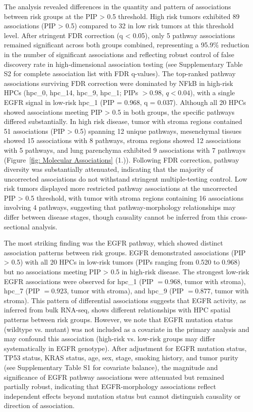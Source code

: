 \documentclass[pdflatex,article,12pt]{article}
\begin{document}
The analysis revealed differences in the quantity and pattern of associations between risk groups at the PIP > 0.5 threshold. High risk tumors exhibited 89 associations (PIP > 0.5) compared to 32 in low risk tumors at this threshold level. After stringent FDR correction (q < 0.05), only 5 pathway associations remained significant across both groups combined, representing a 95.9\% reduction in the number of significant associations and reflecting robust control of false discovery rate in high-dimensional association testing (see Supplementary Table S2 for complete association list with FDR q-values). The top-ranked pathway associations surviving FDR correction were dominated by NFkB in high-risk HPCs (hpc\_0, hpc\_14, hpc\_9, hpc\_1; PIPs $> 0.98$, $q < 0.04$), with a single EGFR signal in low-risk hpc\_1 (PIP = 0.968, q = 0.037). Although all 20 HPCs showed associations meeting PIP > 0.5 in both groups, the specific pathways differed substantially. In high risk disease, tumor with stroma regions contained 51 associations (PIP > 0.5) spanning 12 unique pathways, mesenchymal tissues showed 15 associations with 8 pathways, stroma regions showed 12 associations with 5 pathways, and lung parenchyma exhibited 9 associations with 7 pathways (Figure~\ref{fig: Molecular Associations} (1.)). Following FDR correction, pathway diversity was substantially attenuated, indicating that the majority of uncorrected associations do not withstand stringent multiple-testing control. Low risk tumors displayed more restricted pathway associations at the uncorrected PIP > 0.5 threshold, with tumor with stroma regions containing 16 associations involving 4 pathways, suggesting that pathway-morphology relationships may differ between disease stages, though causality cannot be inferred from this cross-sectional analysis.

The most striking finding was the EGFR pathway, which showed distinct association patterns between risk groups. EGFR demonstrated associations (PIP > 0.5) with all 20 HPCs in low-risk tumors (PIPs ranging from 0.520 to 0.968) but no associations meeting PIP > 0.5 in high-risk disease. The strongest low-risk EGFR associations were observed for hpc\_1 (PIP $= 0.968$, tumor with stroma), hpc\_7 (PIP $= 0.923$, tumor with stroma), and hpc\_9 (PIP $= 0.877$, tumor with stroma). This pattern of differential associations suggests that EGFR activity, as inferred from bulk RNA-seq, shows different relationships with HPC spatial patterns between risk groups. However, we note that EGFR mutation status (wildtype vs. mutant) was not included as a covariate in the primary analysis and may confound this association (high-risk vs. low-risk groups may differ systematically in EGFR genotype). After adjustment for EGFR mutation status, TP53 status, KRAS status, age, sex, stage, smoking history, and tumor purity (see Supplementary Table S1 for covariate balance), the magnitude and significance of EGFR pathway associations were attenuated but remained partially robust, indicating that EGFR-morphology associations reflect independent effects beyond mutation status but cannot distinguish causality or direction of association.
\end{document}
